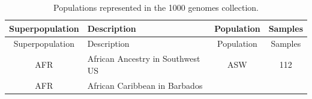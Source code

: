 \documentclass[]{book}
\begin{document}
\begin{longtable}[]{@{}clcc@{}}
\caption{\label{tab:thousand} Populations represented in the 1000 genomes
collection.}\tabularnewline
\toprule
\begin{minipage}[b]{0.14\columnwidth}\centering\strut
Superpopulation\strut
\end{minipage} & \begin{minipage}[b]{0.59\columnwidth}\raggedright\strut
Description\strut
\end{minipage} & \begin{minipage}[b]{0.09\columnwidth}\centering\strut
Population\strut
\end{minipage} & \begin{minipage}[b]{0.07\columnwidth}\centering\strut
Samples\strut
\end{minipage}\tabularnewline
\midrule
\endfirsthead
\toprule
\begin{minipage}[b]{0.14\columnwidth}\centering\strut
Superpopulation\strut
\end{minipage} & \begin{minipage}[b]{0.59\columnwidth}\raggedright\strut
Description\strut
\end{minipage} & \begin{minipage}[b]{0.09\columnwidth}\centering\strut
Population\strut
\end{minipage} & \begin{minipage}[b]{0.07\columnwidth}\centering\strut
Samples\strut
\end{minipage}\tabularnewline
\midrule
\endhead
\begin{minipage}[t]{0.14\columnwidth}\centering\strut
AFR\strut
\end{minipage} & \begin{minipage}[t]{0.59\columnwidth}\raggedright\strut
African Ancestry in Southwest US\strut
\end{minipage} & \begin{minipage}[t]{0.09\columnwidth}\centering\strut
ASW\strut
\end{minipage} & \begin{minipage}[t]{0.07\columnwidth}\centering\strut
112\strut
\end{minipage}\tabularnewline
\begin{minipage}[t]{0.14\columnwidth}\centering\strut
AFR\strut
\end{minipage} & \begin{minipage}[t]{0.59\columnwidth}\raggedright\strut
African Caribbean in Barbados\strut
\end{minipage} & \begin{minipage}[t]{0.09\columnwidth}\centering\strut

\end{minipage}
\end{longtable}
\end{document}
